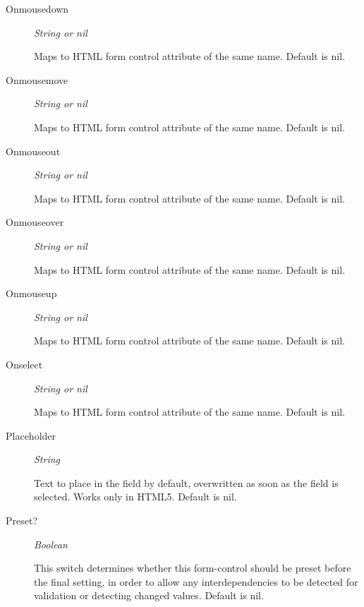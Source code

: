 \documentclass [11pt]{book}
\begin{document}
\begin{itemize}
\begin{description}
\item [Onmousedown]
\emph{String or nil}

 Maps to HTML form control attribute of the same name. Default is nil.




\item [Onmousemove]
\emph{String or nil}

 Maps to HTML form control attribute of the same name. Default is nil.




\item [Onmouseout]
\emph{String or nil}

 Maps to HTML form control attribute of the same name. Default is nil.




\item [Onmouseover]
\emph{String or nil}

 Maps to HTML form control attribute of the same name. Default is nil.




\item [Onmouseup]
\emph{String or nil}

 Maps to HTML form control attribute of the same name. Default is nil.




\item [Onselect]
\emph{String or nil}

 Maps to HTML form control attribute of the same name. Default is nil.




\item [Placeholder]
\emph{String}

 Text to place in the field by default, overwritten as soon as the field is selected. Works only in HTML5. Default is nil.




\item [Preset?]
\emph{Boolean}

 This switch determines whether this form-control should be preset before the final setting,
in order to allow any interdependencies to be detected for validation or detecting changed values. Default is nil.





\end{description}
\end{itemize}
\end{document}
